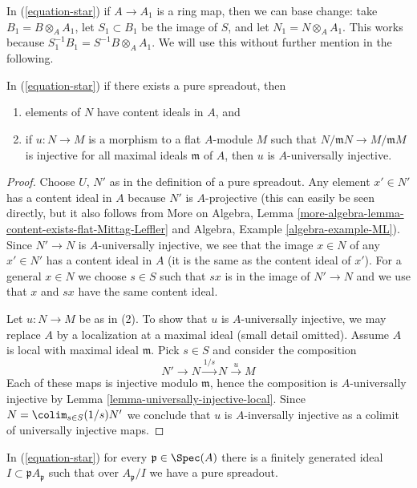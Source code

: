 \medskip\noindent
In (\ref{equation-star}) if $A \to A_1$ is a ring map, then we
can base change: take $B_1 = B \otimes_A A_1$, let $S_1 \subset B_1$
be the image of $S$, and let $N_1 = N \otimes_A A_1$. This works
because $S_1^{-1}B_1 = S^{-1}B \otimes_A A_1$. We will use this
without further mention in the following.

\begin{lemma}
\label{lemma-properties-pure-spreadout}
In (\ref{equation-star}) if there exists a pure spreadout, then
\begin{enumerate}
\item elements of $N$ have content ideals in $A$, and
\item if $u : N \to M$ is a morphism to a flat $A$-module $M$
such that $N/\mathfrak m N \to M/\mathfrak m M$ is injective
for all maximal ideals $\mathfrak m$ of $A$, then $u$ is
$A$-universally injective.
\end{enumerate}
\end{lemma}

\begin{proof}
Choose $U$, $N'$ as in the definition of a pure spreadout.
Any element $x' \in N'$ has a content ideal in $A$ because
$N'$ is $A$-projective (this can easily be seen directly, but
it also follows from More on Algebra, Lemma
\ref{more-algebra-lemma-content-exists-flat-Mittag-Leffler} and
Algebra, Example \ref{algebra-example-ML}).
Since $N' \to N$ is $A$-universally injective, we see that
the image $x \in N$ of any $x' \in N'$ has a content ideal in $A$
(it is the same as the content ideal of $x'$).
For a general $x \in N$ we choose $s \in S$ such that
$s x$ is in the image of $N' \to N$ and we use that $x$ and $sx$
have the same content ideal.

\medskip\noindent
Let $u : N \to M$ be as in (2). To show that $u$ is $A$-universally
injective, we may replace $A$ by a localization at a maximal ideal
(small detail omitted). Assume $A$ is local with maximal ideal $\mathfrak m$.
Pick $s \in S$ and consider the composition
$$
N' \to N \xrightarrow{1/s} N \xrightarrow{u} M
$$
Each of these maps is injective modulo $\mathfrak m$, hence the composition
is $A$-universally injective by
Lemma \ref{lemma-universally-injective-local}.
Since $N = \colim_{s \in S} (1/s)N'$ we conclude that $u$
is $A$-inversally injective as a colimit of universally injective maps.
\end{proof}

\begin{lemma}
\label{lemma-find-pure-spreadout}
In (\ref{equation-star}) for every $\mathfrak p \in \Spec(A)$
there is a finitely generated ideal $I \subset \mathfrak pA_\mathfrak p$
such that over $A_\mathfrak p/I$ we have a pure spreadout.
\end{lemma}

